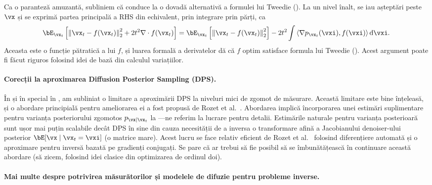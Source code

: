 \documentclass[../../book-main_ro.tex]{subfiles}
\begin{document}
Ca o paranteză amuzantă, subliniem că  conduce la o dovadă
alternativă a formulei lui Tweedie (). La un nivel înalt, se iau
așteptări peste $\vx$ și se exprimă partea principală a RHS din
 echivalent, prin integrare prin părți, ca
\begin{equation}
  \bE_{\vx_t}\left[
    \norm*{\vx_t - f(\vx_t)}_2^2
    + 2t^2 \nabla \cdot f(\vx_t)
    \right]
  =
  \bE_{\vx_t}\left[
    \norm*{\vx_t - f(\vx_t)}_2^2
    \right]
  - 2t^2 \int
  \ip*{\nabla p_{\vx_t}(\vxi)}{f(\vxi)}
  \odif \vxi.
\end{equation}
Aceasta este o funcție pătratică a lui $f$, și luarea formală a derivatelor dă
că $f$ optim satisface formula lui Tweedie (). Acest
argument poate fi făcut riguros folosind idei de bază din calculul variațiilor.


\paragraph{Corecții la aproximarea Diffusion Posterior Sampling (DPS).}
În  și în special în
, am subliniat
o limitare a aproximării DPS
 la
niveluri mici de zgomot de măsurare.
Această limitare este bine înțeleasă, și o abordare principială pentru ameliorarea ei
a fost propusă de Rozet et al.\ \cite{rozet2024learning}.
Abordarea implică încorporarea unei estimări suplimentare pentru varianța
posteriorului zgomotos $p_{\vx \mid \vx_t}$ la
---ne
referim la lucrare pentru detalii.
Estimările naturale pentru varianța posterioară sunt ușor mai puțin scalabile decât DPS
în sine din cauza necesității de a inversa o transformare afină a Jacobianului
denoiser-ului posterior $\bE[\vx \mid \vx_t=\vxi]$ (o matrice mare). Acest lucru se face
relativ eficient de Rozet et al.\ \cite{rozet2024learning} folosind diferențiere automată și o
aproximare pentru inversă bazată pe gradienți conjugați. Se pare că ar trebui
să fie posibil să se îmbunătățească în continuare această abordare (să zicem, folosind idei
clasice din optimizarea de ordinul doi).


\paragraph{Mai multe despre potrivirea măsurătorilor și modelele de difuzie pentru probleme
inverse.}
\end{document}
